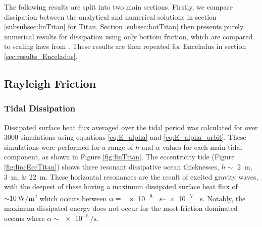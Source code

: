 The following results are split into two main sections. Firstly, we compare dissipation between the analytical and numerical solutions in section \ref{subsubsec:linTitan} for Titan. Section \ref{subsec:botTitan} then presents purely numerical results for dissipation using only bottom friction, which are compared to scaling laws from \citet{chen2013tidal}. These results are then repeated for Enceladus in section \ref{sec:results_Enceladus}.

\subsection{Rayleigh Friction}

\subsubsection{Tidal Dissipation \label{subsubsec:linTitan}}

Dissipated surface heat flux averaged over the tidal period was calculated for over 3000 simulations using equations \ref{eq:E_alpha} and \ref{eq:E_alpha_orbit}. These simulations were performed for a range of $h$ and $\alpha$ values for each main tidal component, as shown in Figure \ref{fig:linTitan}. The eccentricity tide (Figure \ref{fig:lincEccTitan}) shows three resonant dissipative ocean thicknesses, $h \sim$ \SIlist{2;3;22}{\metre}. These horizontal resonances are the result of excited gravity waves, with the deepest of these having a maximum dissipated surface heat flux of $\sim 10\, \si{\watt\per\square\metre}$ which occurs between $\alpha =$ \SIrange{e-8}{e-7}{\per\second}. Notably, the maximum dissipated energy does not occur for the most friction dominated oceans where $\alpha \sim \num{e-5} \, \si{\per\second}$. 

